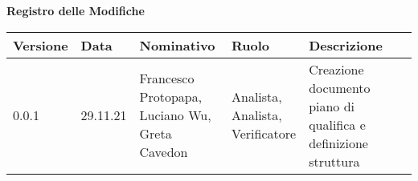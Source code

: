{\LARGE{\textbf{Registro delle Modifiche}}} \\

\renewcommand{\arraystretch}{2}
\begin{tabular}{|m{}<{\centering}|m{}<{\centering}|m{}<{\centering}|m{}<{\centering}|m{}<{\centering}|}
	\hline \rowcolor{azzurro_scuro!70}
	\textbf{Versione}&\textbf{Data}&\textbf{Nominativo}&\textbf{Ruolo}&\textbf{Descrizione}\\
	\hline \rowcolor{azzurro_chiaro!30}
	 0.0.1&29.11.21&\shortstack{Francesco Protopapa,\\Luciano Wu,\\Greta Cavedon}&\shortstack{Analista,\\Analista,\\Verificatore}&Creazione documento piano di qualifica e definizione struttura
	 \\
	 \hline
\end{tabular}